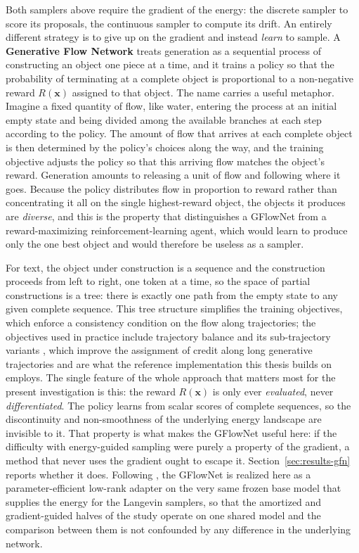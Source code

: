 Both samplers above require the gradient of the energy: the discrete sampler to score its proposals, the continuous sampler to compute its drift. An entirely different strategy is to give up on the gradient and instead \emph{learn} to sample. A \textbf{Generative Flow Network} \citep{bengio2021flow, bengio2023gflownet} treats generation as a sequential process of constructing an object one piece at a time, and it trains a policy so that the probability of terminating at a complete object is proportional to a non-negative reward $R(\bm{x})$ assigned to that object. The name carries a useful metaphor. Imagine a fixed quantity of flow, like water, entering the process at an initial empty state and being divided among the available branches at each step according to the policy. The amount of flow that arrives at each complete object is then determined by the policy's choices along the way, and the training objective adjusts the policy so that this arriving flow matches the object's reward. Generation amounts to releasing a unit of flow and following where it goes. Because the policy distributes flow in proportion to reward rather than concentrating it all on the single highest-reward object, the objects it produces are \emph{diverse}, and this is the property that distinguishes a GFlowNet from a reward-maximizing reinforcement-learning agent, which would learn to produce only the one best object and would therefore be useless as a sampler.

For text, the object under construction is a sequence and the construction proceeds from left to right, one token at a time, so the space of partial constructions is a tree: there is exactly one path from the empty state to any given complete sequence. This tree structure simplifies the training objectives, which enforce a consistency condition on the flow along trajectories; the objectives used in practice include trajectory balance \citep{malkin2022trajectory} and its sub-trajectory variants \citep{madan2023learning}, which improve the assignment of credit along long generative trajectories and are what the reference implementation this thesis builds on employs. The single feature of the whole approach that matters most for the present investigation is this: the reward $R(\bm{x})$ is only ever \emph{evaluated}, never \emph{differentiated}. The policy learns from scalar scores of complete sequences, so the discontinuity and non-smoothness of the underlying energy landscape are invisible to it. That property is what makes the GFlowNet useful here: if the difficulty with energy-guided sampling were purely a property of the gradient, a method that never uses the gradient ought to escape it. Section~\ref{sec:results-gfn} reports whether it does. Following \citet{hu2024amortizing}, the GFlowNet is realized here as a parameter-efficient low-rank adapter \citep{hu2022lora} on the very same frozen base model that supplies the energy for the Langevin samplers, so that the amortized and gradient-guided halves of the study operate on one shared model and the comparison between them is not confounded by any difference in the underlying network.
